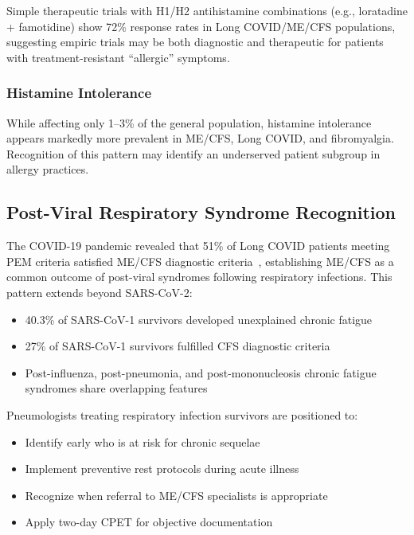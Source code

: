 Simple therapeutic trials with H1/H2 antihistamine combinations (e.g., loratadine + famotidine) show 72\% response rates in Long COVID/ME/CFS populations, suggesting empiric trials may be both diagnostic and therapeutic for patients with treatment-resistant ``allergic'' symptoms.

\subsubsection{Histamine Intolerance}

While affecting only 1--3\% of the general population, histamine intolerance appears markedly more prevalent in ME/CFS, Long COVID, and fibromyalgia. Recognition of this pattern may identify an underserved patient subgroup in allergy practices.

\subsection{Post-Viral Respiratory Syndrome Recognition}

The COVID-19 pandemic revealed that 51\% of Long COVID patients meeting PEM criteria satisfied ME/CFS diagnostic criteria~\cite{Komaroff2023}, establishing ME/CFS as a common outcome of post-viral syndromes following respiratory infections. This pattern extends beyond SARS-CoV-2:

\begin{itemize}
    \item 40.3\% of SARS-CoV-1 survivors developed unexplained chronic fatigue
    \item 27\% of SARS-CoV-1 survivors fulfilled CFS diagnostic criteria
    \item Post-influenza, post-pneumonia, and post-mononucleosis chronic fatigue syndromes share overlapping features
\end{itemize}

Pneumologists treating respiratory infection survivors are positioned to:
\begin{itemize}
    \item Identify early who is at risk for chronic sequelae
    \item Implement preventive rest protocols during acute illness
    \item Recognize when referral to ME/CFS specialists is appropriate
    \item Apply two-day CPET for objective documentation
\end{itemize}

